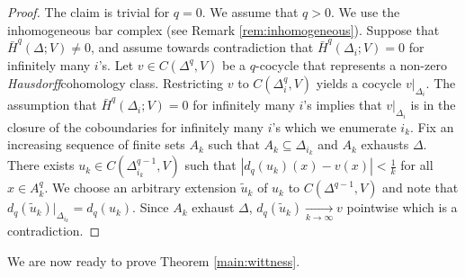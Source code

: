 \documentclass[12pt,reqno]{amsart}
\theoremstyle{definition}
\begin{document}
\begin{proof}
    The claim is trivial for $q=0$. We assume that $q>0$. We use the inhomogeneous bar complex (see Remark \ref{rem:inhomogeneous}). Suppose that $\bar{H}^q(\Delta ; V) \ne 0$, and assume towards contradiction that $\bar{H}^q(\Delta_i ; V) = 0$ for infinitely many $i$'s. Let $v \in C(\Delta^q,V)$ be a $q$-cocycle that represents a non-zero \textit{Hausdorff}cohomology class. Restricting $v$ to $C(\Delta_i^q,V)$ yields a cocycle $v|_{\Delta_i}$. The assumption that $\bar{H}^q(\Delta_i ; V) = 0$ for infinitely many $i$'s implies that $v|_{\Delta_i}$ is in the closure of the coboundaries for infinitely many $i$'s which we enumerate $i_k$.
    Fix an increasing sequence of finite sets $A_k$ such that $A_k \subseteq \Delta_{i_k}$ and $A_k$ exhausts $\Delta$.
     There exists $u_k \in C(\Delta_{i_k}^{q-1},V)$ such that $|d_q(u_k)(x) -v(x)|<\frac{1}{k}$ for all $x \in A_k^q$. We choose an arbitrary extension $\tilde{u}_k$ of $u_k$ to $C(\Delta^{q-1},V)$ and note that $d_q(\tilde{u}_k)|_{\Delta_{i_k}} = d_q(u_k)$. Since $A_k$ exhaust $\Delta$, $d_q(\tilde{u}_k) \xrightarrow[k \to \infty]{} v$ pointwise which is a contradiction.
\end{proof}
We are now ready to prove Theorem \ref{main:wittness}.
\end{document}
